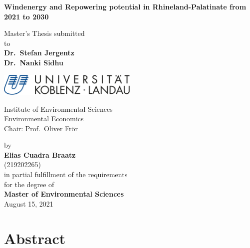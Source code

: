 \documentclass[a4paper,11pt]{article}
\begin{document}
\thispagestyle{empty}
\begin{center}
  \vspace*{5mm}
  \linespread{1.5}
  {\huge{\bf Windenergy and Repowering potential in Rhineland-Palatinate from 2021 to 2030}\par}\vspace{1cm}
  Master's Thesis submitted \\\vspace{0.5cm}
  to \\\vspace{0.5cm}
  \textbf{Dr.~Stefan Jergentz} \\
  \textbf{Dr.~Nanki Sidhu} \\\vspace{1.5cm}
  
  
  \includegraphics[width=0.5\textwidth]{Uni-Logo-2.jpg}
  
  Institute of Environmental Sciences \\
  Environmental Economics \\
   Chair: Prof.~Oliver Frör \\  \vspace{1cm}

  
  
  by \\\vspace{0.5cm}
  \textbf{Elias Cuadra Braatz} \\
  (219202265) \\
  
  \medskip
  \medskip
  in partial fulfillment of the requirements \\
  for the degree of \\
  \textbf{Master of Environmental Sciences} \\\vspace{0.5cm}
  August 15, 2021
  
\end{center}


\newpage
\tableofcontents
\clearpage

\newpage
\hypertarget{abstract}{%
\section*{Abstract}\label{abstract}}
\end{document}
